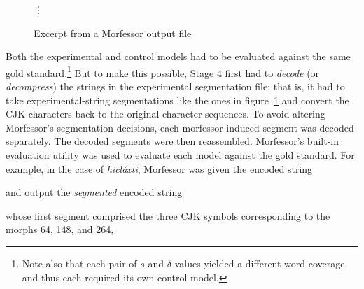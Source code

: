 {\begin{figure}[t]
\begin{mdframed}
\vdots
\caption{Excerpt from a Morfessor output file}
\label{fig:morfessor-output}
\end{mdframed}
\end{figure}
Both the experimental and control models had to be evaluated against the same gold standard.\footnote{Note also that each
pair of $s$ and $\delta$ values yielded a different word coverage
and thus 
each required its own control model.}
But to make this possible, Stage 4 first had to \emph{decode} (or \emph{decompress}) the strings in the experimental segmentation file; that is, it had to take experimental-string segmentations like the ones in 
figure~\ref{fig:morfessor-output} and convert the CJK characters back to the original character sequences.
To avoid altering Morfessor’s segmentation decisions, 
each morfessor-induced segment 
was decoded separately. The decoded segments were then reassembled. 
Morfessor's built-in evaluation utility was used to evaluate each model against the gold standard. 
For example, 
in the case of \textit{hicl\'{a}xti}, %
Morfessor was given the encoded string 
\begin{center}
\end{center}
and output the \emph{segmented} encoded string
\begin{center}
\end{center}
whose first segment comprised the three  
CJK symbols corresponding to the morphs 64, 148, and 264, 
}
